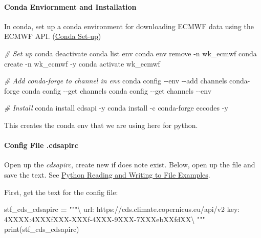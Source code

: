 \documentclass[
]{book}
\newenvironment{Shaded}{\begin{snugshade}}{\end{snugshade}}
\newcommand{\BuiltInTok}[1]{#1}
\newcommand{\CommentTok}[1]{\textcolor[rgb]{0.56,0.35,0.01}{\textit{#1}}}
\newcommand{\ExtensionTok}[1]{#1}
\newcommand{\NormalTok}[1]{#1}
\newcommand{\OperatorTok}[1]{\textcolor[rgb]{0.81,0.36,0.00}{\textbf{#1}}}
\newcommand{\StringTok}[1]{\textcolor[rgb]{0.31,0.60,0.02}{#1}}
\begin{document}
\hypertarget{conda-enviornment-and-installation}{%
\paragraph{Conda Enviornment and Installation}\label{conda-enviornment-and-installation}}

In conda, set up a conda environment for downloading ECMWF data using the ECMWF API. (\href{https://fanwangecon.github.io/Tex4Econ/nontex/install/windows/fn_installations.html}{Conda Set-up})

\begin{Shaded}
\begin{Highlighting}[]
\CommentTok{\# Set up}
\ExtensionTok{conda}\NormalTok{ deactivate}
\ExtensionTok{conda}\NormalTok{ list env}
\ExtensionTok{conda}\NormalTok{ env remove {-}n wk\_ecmwf}
\ExtensionTok{conda}\NormalTok{ create {-}n wk\_ecmwf {-}y}
\ExtensionTok{conda}\NormalTok{ activate wk\_ecmwf}

\CommentTok{\# Add conda{-}forge to channel in env}
\ExtensionTok{conda}\NormalTok{ config {-}{-}env {-}{-}add channels conda{-}forge}
\ExtensionTok{conda}\NormalTok{ config {-}{-}get channels}
\ExtensionTok{conda}\NormalTok{ config {-}{-}get channels {-}{-}env}

\CommentTok{\# Install}
\ExtensionTok{conda}\NormalTok{ install cdsapi {-}y}
\ExtensionTok{conda}\NormalTok{ install {-}c conda{-}forge eccodes {-}y}
\end{Highlighting}
\end{Shaded}

This creates the conda env that we are using here for python.

\hypertarget{config-file-.cdsapirc}{%
\paragraph{Config File .cdsapirc}\label{config-file-.cdsapirc}}

Open up the \emph{cdsapirc}, create new if does note exist. Below, open up the file and save the text. See \href{https://fanwangecon.github.io/pyfan/vig/support/inout/htmlpdfr/fp_files.html}{Python Reading and Writing to File Examples}.

First, get the text for the config file:

\begin{Shaded}
\begin{Highlighting}[]
\NormalTok{stf\_cds\_cdsapirc }\OperatorTok{=} \StringTok{"""\textbackslash{}}
\StringTok{url: https://cds.climate.copernicus.eu/api/v2}
\StringTok{key: 4XXXX:4XXXfXXX{-}XXXf{-}4XXX{-}9XXX{-}7XXXebXXfdXX\textbackslash{}}
\StringTok{"""}
\BuiltInTok{print}\NormalTok{(stf\_cds\_cdsapirc)}
\end{Highlighting}
\end{Shaded}
\end{document}
